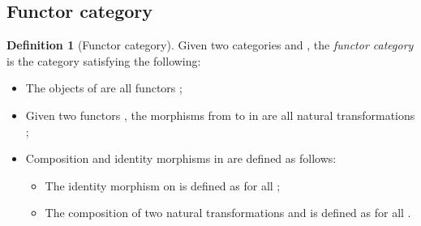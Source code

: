 \documentclass[12pt,a4paper]{report}
\theoremstyle{definition}
\newtheorem{definition}{Definition}[chapter]
\begin{document}
        \subsection{Functor category}
        \begin{definition}[Functor category]
            Given two categories  and , the \emph{functor category}  is the category satisfying the following:
            \begin{itemize}
                \item 
                    The objects of  are all functors ;
                \item 
                    Given two functors , the morphisms from  to  in  are all natural transformations ;
                \item
                    Composition and identity morphisms in  are defined as follows:
                    \begin{itemize}
                        \item 
                            The identity morphism  on  is defined as  for all ;
                        \item
                            The composition of two natural transformations  and  is defined as  for all .
                    \end{itemize}
            \end{itemize}
        \end{definition}
\end{document}
